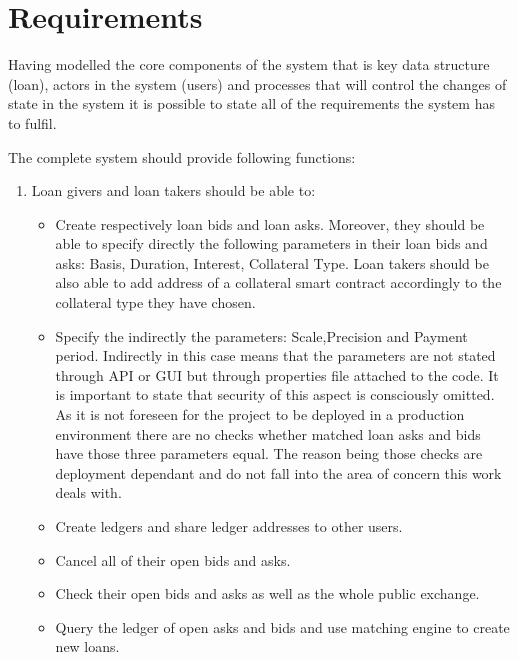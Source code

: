 \documentclass[a4paper,12pt,twoside,openany]{report}
\begin{document}
\section{Requirements}

Having modelled the core components of the system that is key data structure (loan), actors in the system (users) and processes that will control the changes of state in the system it is possible to state all of the requirements the system has to fulfil.

The complete system should provide following functions:
\begin{enumerate}

\item Loan givers and loan takers should be able to:
\begin{itemize}
\item Create respectively loan bids and loan asks. Moreover, they should be able to specify directly the following parameters in their loan bids and asks: Basis, Duration, Interest, Collateral Type. Loan takers should be also able to add address of a collateral smart contract accordingly to the collateral type they have chosen.
\item Specify the indirectly the parameters: Scale,Precision and Payment period. Indirectly in this case means that the parameters are not stated through API or GUI but through properties file attached to the code. It is important to state that security of this aspect is consciously omitted. As it is not foreseen for the project to be deployed in a production environment there are no checks whether matched loan asks and bids have those three parameters equal. The reason being those checks are deployment dependant and do not fall into the area of concern this work deals with.
\item Create ledgers and share ledger addresses to other users.
\item Cancel all of their open bids and asks.
\item Check their open bids and asks as well as the whole public exchange.
\item Query the ledger of open asks and bids and use matching engine to create new loans.
\end{itemize}


\end{enumerate}
\end{document}
